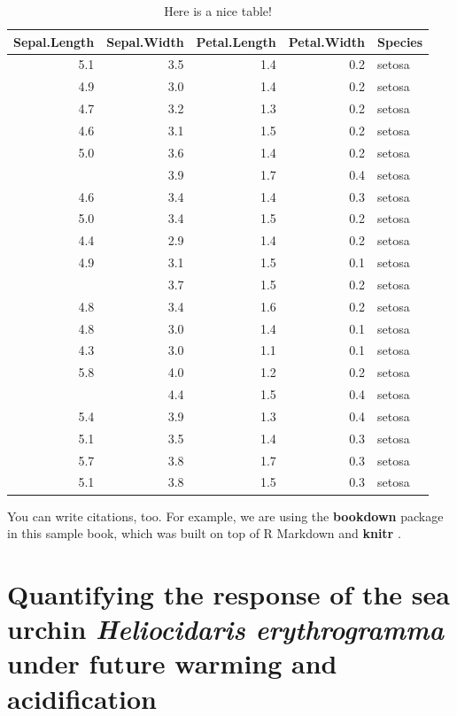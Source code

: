 \documentclass[oneside, a4paper]{memoir}
\theoremstyle{definition}
\theoremstyle{definition}
\theoremstyle{definition}
\theoremstyle{remark}
\begin{document}
\begin{table}

\caption{\label{tab:nice-tab}Here is a nice table!}
\centering
\begin{tabular}[t]{rrrrl}
\toprule
Sepal.Length & Sepal.Width & Petal.Length & Petal.Width & Species\\
\midrule
5.1 & 3.5 & 1.4 & 0.2 & setosa\\
4.9 & 3.0 & 1.4 & 0.2 & setosa\\
4.7 & 3.2 & 1.3 & 0.2 & setosa\\
4.6 & 3.1 & 1.5 & 0.2 & setosa\\
5.0 & 3.6 & 1.4 & 0.2 & setosa\\
\addlinespace
5.4 & 3.9 & 1.7 & 0.4 & setosa\\
4.6 & 3.4 & 1.4 & 0.3 & setosa\\
5.0 & 3.4 & 1.5 & 0.2 & setosa\\
4.4 & 2.9 & 1.4 & 0.2 & setosa\\
4.9 & 3.1 & 1.5 & 0.1 & setosa\\
\addlinespace
5.4 & 3.7 & 1.5 & 0.2 & setosa\\
4.8 & 3.4 & 1.6 & 0.2 & setosa\\
4.8 & 3.0 & 1.4 & 0.1 & setosa\\
4.3 & 3.0 & 1.1 & 0.1 & setosa\\
5.8 & 4.0 & 1.2 & 0.2 & setosa\\
\addlinespace
5.7 & 4.4 & 1.5 & 0.4 & setosa\\
5.4 & 3.9 & 1.3 & 0.4 & setosa\\
5.1 & 3.5 & 1.4 & 0.3 & setosa\\
5.7 & 3.8 & 1.7 & 0.3 & setosa\\
5.1 & 3.8 & 1.5 & 0.3 & setosa\\
\bottomrule
\end{tabular}
\end{table}

You can write citations, too. For example, we are using the
\textbf{bookdown} package \citep{R-bookdown} in this sample book, which
was built on top of R Markdown and \textbf{knitr} \citep{xie2015}.

\chapter{\texorpdfstring{Quantifying the response of the sea urchin
\emph{Heliocidaris erythrogramma} under future warming and
acidification}{Quantifying the response of the sea urchin Heliocidaris erythrogramma under future warming and acidification}}\label{quantifying-the-response-of-the-sea-urchin-heliocidaris-erythrogramma-under-future-warming-and-acidification}
\end{document}

